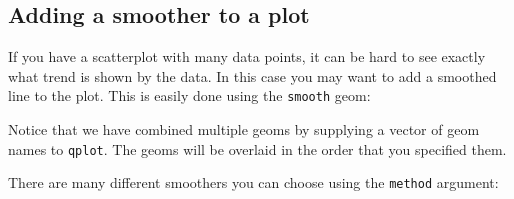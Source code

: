 

\subsection{Adding a smoother to a plot}\label{sub:smooth}

If you have a scatterplot with many data points, it can be hard to see exactly what trend is shown by the data.  In this case you may want to add a smoothed line to the plot.  This is easily done using the {\tt smooth} geom:

% 


Notice that we have combined multiple geoms by supplying a vector of geom names to {\tt qplot}.  The geoms will be overlaid in the order that you specified them.

There are many different smoothers you can choose using the {\tt method} argument:

